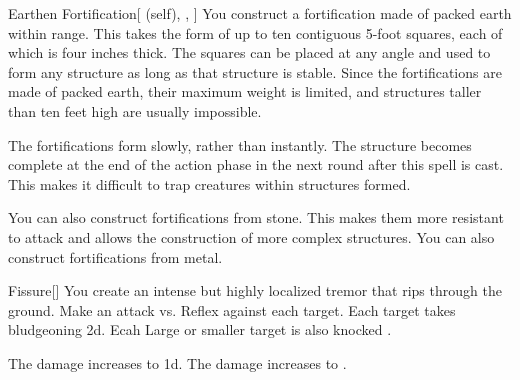 \lowercase{\hypertarget{spell:Earthen Fortification}{}}\label{spell:Earthen Fortification}
\begin{attuneability}[Rank 4]{\hypertarget{spell:Earthen Fortification}{Earthen Fortification}}[ (self), , ]
\targetrule
You construct a fortification made of packed earth within \rngmed range.
This takes the form of up to ten contiguous 5-foot squares, each of which is four inches thick.
The squares can be placed at any angle and used to form any structure as long as that structure is stable.
Since the fortifications are made of packed earth, their maximum weight is limited, and structures taller than ten feet high are usually impossible.

The fortifications form slowly, rather than instantly.
The structure becomes complete at the end of the action phase in the next round after this spell is cast.
This makes it difficult to trap creatures within structures formed.

\rankline
{} You can also construct fortifications from stone.
This makes them more resistant to attack and allows the construction of more complex structures.
 You can also construct fortifications from metal.

\end{attuneability}
\vspace{0.25em}



\lowercase{\hypertarget{spell:Fissure}{}}\label{spell:Fissure}
\begin{freeability}[Rank 4]{\hypertarget{spell:Fissure}{Fissure}}[]
You create an intense but highly localized tremor that rips through the ground.
Make an attack vs. Reflex against each target.
\hit Each target takes bludgeoning  \minus2d.
Ecah Large or smaller target is also knocked .

\rankline
{} The damage increases to  \minus1d.
 The damage increases to .

\end{freeability}
\vspace{0.25em}



